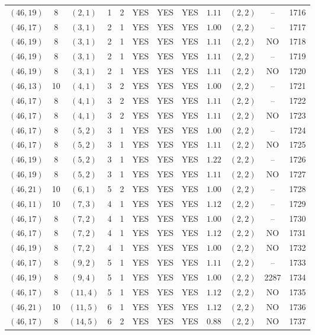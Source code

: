 \begin{longtable}{|c|c|c|c|c|c|c|c|c|c|c|c|}
$(46,19)$ & 8 & $(2,1)$ & 1 & 2 & YES & YES & YES & $1.11$ & $(2,2)$ & -- & 1716\\
$(46,17)$ & 8 & $(3,1)$ & 2 & 1 & YES & YES & YES & $1.00$ & $(2,2)$ & -- & 1717\\
$(46,19)$ & 8 & $(3,1)$ & 2 & 1 & YES & YES & YES & $1.11$ & $(2,2)$ & NO & 1718\\
$(46,19)$ & 8 & $(3,1)$ & 2 & 1 & YES & YES & YES & $1.11$ & $(2,2)$ & -- & 1719\\
$(46,19)$ & 8 & $(3,1)$ & 2 & 1 & YES & YES & YES & $1.11$ & $(2,2)$ & NO & 1720\\
$(46,13)$ & 10 & $(4,1)$ & 3 & 2 & YES & YES & YES & $1.00$ & $(2,2)$ & -- & 1721\\
$(46,17)$ & 8 & $(4,1)$ & 3 & 2 & YES & YES & YES & $1.11$ & $(2,2)$ & -- & 1722\\
$(46,17)$ & 8 & $(4,1)$ & 3 & 2 & YES & YES & YES & $1.11$ & $(2,2)$ & NO & 1723\\
$(46,17)$ & 8 & $(5,2)$ & 3 & 1 & YES & YES & YES & $1.00$ & $(2,2)$ & -- & 1724\\
$(46,17)$ & 8 & $(5,2)$ & 3 & 1 & YES & YES & YES & $1.11$ & $(2,2)$ & NO & 1725\\
$(46,19)$ & 8 & $(5,2)$ & 3 & 1 & YES & YES & YES & $1.22$ & $(2,2)$ & -- & 1726\\
$(46,19)$ & 8 & $(5,2)$ & 3 & 1 & YES & YES & YES & $1.11$ & $(2,2)$ & NO & 1727\\
$(46,21)$ & 10 & $(6,1)$ & 5 & 2 & YES & YES & YES & $1.00$ & $(2,2)$ & -- & 1728\\
$(46,11)$ & 10 & $(7,3)$ & 4 & 1 & YES & YES & YES & $1.12$ & $(2,2)$ & -- & 1729\\
$(46,17)$ & 8 & $(7,2)$ & 4 & 1 & YES & YES & YES & $1.00$ & $(2,2)$ & -- & 1730\\
$(46,17)$ & 8 & $(7,2)$ & 4 & 1 & YES & YES & YES & $1.12$ & $(2,2)$ & NO & 1731\\
$(46,19)$ & 8 & $(7,2)$ & 4 & 1 & YES & YES & YES & $1.00$ & $(2,2)$ & NO & 1732\\
$(46,17)$ & 8 & $(9,2)$ & 5 & 1 & YES & YES & YES & $1.11$ & $(2,2)$ & -- & 1733\\
$(46,19)$ & 8 & $(9,4)$ & 5 & 1 & YES & YES & YES & $1.00$ & $(2,2)$ & 2287 & 1734\\
$(46,17)$ & 8 & $(11,4)$ & 5 & 1 & YES & YES & YES & $1.12$ & $(2,2)$ & NO & 1735\\
$(46,21)$ & 10 & $(11,5)$ & 6 & 1 & YES & YES & YES & $1.12$ & $(2,2)$ & NO & 1736\\
$(46,17)$ & 8 & $(14,5)$ & 6 & 2 & YES & YES & YES & $0.88$ & $(2,2)$ & NO & 1737\\

\end{longtable}
